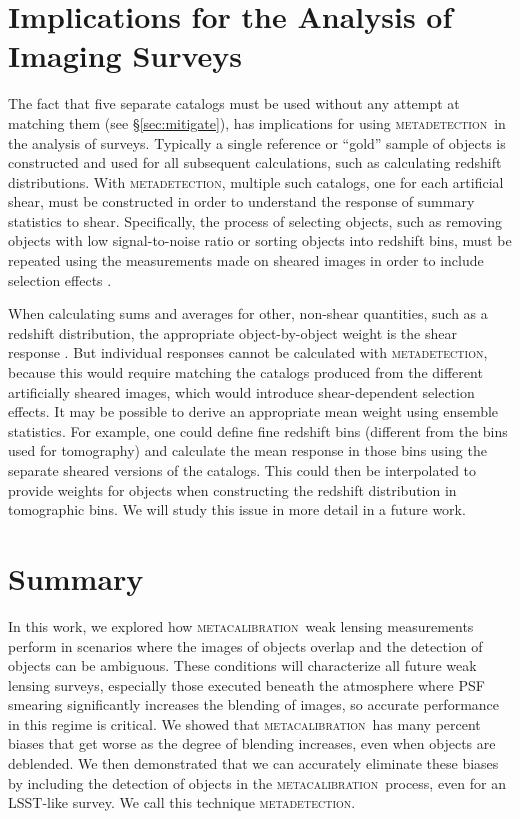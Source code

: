 \documentclass[draft, iop, twocolappendix, appendixfloats, numberedappendix, apj]{hackemulateapj}
\newcommand{\mcal}{\textsc{metacalibration}}
\newcommand{\mdet}{\textsc{metadetection}}
\begin{document}
\section{Implications for the Analysis of Imaging Surveys} \label{sec:wavg}

The fact that five separate catalogs must be used without any attempt at
matching them (see \S \ref{sec:mitigate}), has implications for using \mdet\ in
the analysis of surveys.  Typically a single reference or ``gold'' sample of
objects is constructed and used for all subsequent calculations, such as
calculating redshift distributions.  With \mdet, multiple such catalogs, one
for each artificial shear, must be constructed in order to understand the
response of summary statistics to shear.  Specifically, the process of
selecting objects, such as removing objects with low signal-to-noise ratio or
sorting objects into redshift bins, must be repeated using the measurements made on
sheared images in order to include selection effects \citep{SheldonMcal2017}.

When calculating sums and averages for other, non-shear quantities, such as a
redshift distribution, the appropriate object-by-object weight is the shear
response \citep{SheldonMcal2017}.  But individual responses cannot be
calculated with \mdet, because this would require matching the catalogs
produced from the different artificially sheared images, which would introduce
shear-dependent selection effects.  It may be possible to derive an appropriate
mean weight using ensemble statistics.  For example, one could define fine
redshift bins (different from the bins used for tomography) and calculate the
mean response in those bins using the separate sheared versions of the
catalogs. This could then be interpolated to provide weights for objects when
constructing the redshift distribution in tomographic bins.  We will study this
issue in more detail in a future work.


\section{Summary}\label{sec:conc}

In this work, we explored how \mcal\ weak lensing measurements perform in
scenarios where the images of objects overlap and the detection of objects can
be ambiguous. These conditions will characterize all future weak lensing
surveys, especially those executed beneath the atmosphere where PSF smearing
significantly increases the blending of images, so accurate performance in this
regime is critical. We showed that \mcal\ has many percent biases that get worse
as the degree of blending increases, even when objects are deblended.  We then
demonstrated that we can accurately eliminate these biases by including
the detection of objects in the \mcal\ process, even for an LSST-like survey.
We call this technique \mdet.
\end{document}
